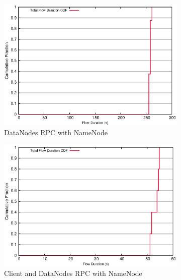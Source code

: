 \begin{figure}[!htbp]
\label{fig:write_duration}
\centering
  \begin{subfigure}[b]{.45\linewidth}
   \centering
	\includegraphics[width=.99\textwidth]{figures/6writes/24_28_type_flow_duration.eps} 
	\caption{DataNodes RPC with NameNode}\label{fig:write_duration:dn_rpc}
   \end{subfigure}%
  \begin{subfigure}[b]{.45\linewidth}
   \centering
	\includegraphics[width=.99\textwidth]{figures/6writes/24_28_20_16_type_flow_duration.eps} 
	\caption{Client and DataNodes RPC with NameNode}\label{fig:write_duration:dc_rpc}
   \end{subfigure} \\%
  \begin{subfigure}[b]{.45\linewidth}
   \centering

\end{subfigure}
\end{figure}
